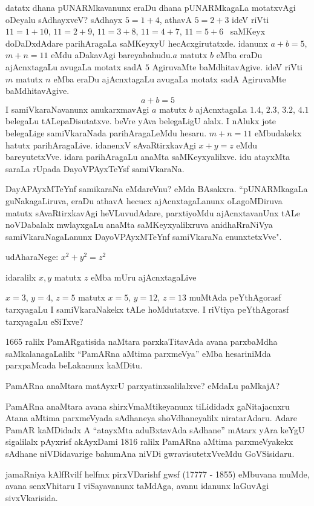 datatx dhana pUNARMkavanunx eraDu dhana pUNARMkagaLa motatxvAgi oDeyalu sAdhayxveV? sAdhayx $5=1+4$, athavA $5=2+3$ ideV riVti $11=1+10$, $11=2+9$,  $11=3+8$, $11=4+7$, $11=5+6$~ saMKeyx doDaDxdAdare parihAragaLa saMKeyxyU hecAcxgirutatxde. idanunx $a+b=5$, $m+n=11$ eMdu aDakavAgi bareyabahudu.\break $a$\; matutx \;$b$\; eMba eraDu ajAcnxtagaLu avugaLa motatx sadA $5$ AgiruvaMte baMdhitavAgive. ideV riVti \;$m$\; matutx \;$n$\; eMba eraDu ajAcnxtagaLu avugaLa motatx sadA AgiruvaMte baMdhitavAgive.
$$
a+b=5
$$
I samiVkaraNavanunx anukarxmavAgi $a$ matutx $b$ ajAcnxtagaLa $1.4$, $2.3$, $3.2$, $4.1$ belegaLu tALepaDisutatxve. beVre yAva belegaLigU alalx. I nAlukx jote belegaLige samiVkaraNada parihAragaLeMdu hesaru. $m+n=11$ eMbudakekx hatutx parihAragaLive. idanenxV sAvaRtirxkavAgi  $x+y=z$ eMdu bareyutetxVve. idara parihAragaLu anaMta saMKeyxyalilxve. idu atayxMta saraLa rUpada DayoVPAyxTeYsf samiVkaraNa.

DayAPAyxMTeYnf samikaraNa eMdareVnu? eMda BAsakxra. ``pUNARMkagaLa guNaka\-gaLiruva, eraDu athavA hecucx ajAcnxtagaLanunx oLagoMDiruva matutx sAvaRtirxkavAgi heVLuvudAdare, parxtiyoMdu ajAcnxtavanUnx tALe noVDabalalx mwlayxgaLu anaMta saMKeyxyalilxruva anidhaRraNiVya samiVkaraNagaLanunx DayoVPAyxMTeYnf samiVkaraNa enunxtetxVve".

udAharaNege: \quad $x^2+y^2=z^2$

idaralilx $x,y$ matutx $z$ eMba mUru ajAcnxtagaLive 

$x=3$, $y=4$, $z=5$ matutx $x=5$, $y=12$, $z=13$ muMtAda peYthAgorasf tarxyagaLu I samiVkaraNakekx tALe hoMdutatxve. I riVtiya peYthAgorasf tarxyagaLu eSiTxve? 

{\rm 1665} ralilx PamARgatisida naMtara parxkaTitavAda avana parxbaMdha saMkalanagaLalilx ``PamARna aMtima parxmeVya'' eMba hesariniMda parxpaMcada beLakanunx kaMDitu.

PamARna anaMtara matAyxrU parxyatinxsalilalxve? eMdaLu paMkajA?

PamARna anaMtara avana shirxVmaMtikeyanunx tiLididadx gaNitajacnxru Atana aMtima parxmeVyada sAdhaneya shoVdhaneyalilx niratarAdaru. Adare PamAR kaMDidadx A ``atayxMta aduBxtavAda sAdhane'' mAtarx yAra keYgU sigalilalx pAyxrisf akAyxDami {\rm 1816} ralilx PamARna aMtima parxmeVyakekx sAdhane niVDidavarige bahumAna niVDi gwravisutetxVveMdu  GoVSisidaru.

jamaRniya kAlfRvilf helfmx pirxVDarishf gwsf {\rm (17777 - 1855)} eMbuvana muMde, avana senxVhitaru I viSayavanunx taMdAga, avanu idanunx laGuvAgi sivxVkarisida.

